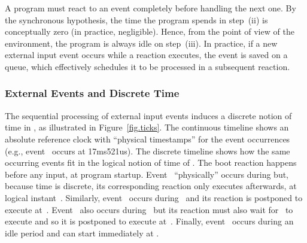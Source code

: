 A program must react to an event completely before handling the next one.
%
By the synchronous hypothesis, the time the program spends in step~(ii) is
conceptually zero (in practice, negligible).
%
Hence, from the point of view of the environment, the program is always
idle on step~(iii).
%
In practice, if a new external input event occurs while a reaction executes,
the event is saved on a queue, which effectively schedules it to be processed
in a subsequent reaction.

\subsubsection{External Events and Discrete Time}

The sequential processing of external input events induces a discrete notion of
time in \CEU, as illustrated in Figure~\ref{fig.ticks}.
%
The continuous timeline shows an absolute reference clock with ``physical
timestamps'' for the event occurrences (e.g., event~ occurs at
17ms521us).
%
The discrete timeline shows how the same occurring events fit in the logical
notion of time of \CEU.
%
The boot reaction  happens before any input, at program startup.
%
Event~ ``physically'' occurs during  but, because time
is discrete, its corresponding reaction only executes afterwards, at logical
instant~.
%
Similarly, event~ occurs during~ and its reaction is
postponed to execute at~.
%
Event~ also occurs during~ but its reaction must also wait
for~ to execute and so it is postponed to execute at~.
%
Finally, event~ occurs during an idle period and can start immediately
at .
%

